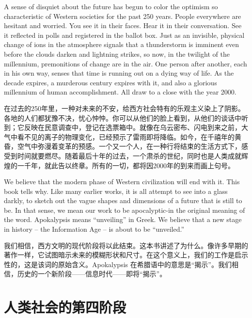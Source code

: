 \begin{Parallel}{97mm}{45mm}
  \ParallelPar
  
  \ParallelLText
  {A sense of disquiet about the future has begun to color the optimism so characteristic of Western societies for the past 250 years. People everywhere are hesitant and worried. You see it in their faces. Hear it in their conversation. See it reflected in polls and registered in the ballot box. Just as an invisible, physical change of ions in the atmosphere signals that a thunderstorm is imminent even before the clouds darken and lightning strikes, so now, in the twilight of the millennium, premonitions of change are in the air. One person after another, each in his own way, senses that time is running out on a dying way of life. As the decade expires, a murderous century expires with it, and also a glorious millennium of human accomplishment. All draw to a close with the year 2000. }
  
  \ParallelRText
  {\small 在过去的250年里，一种对未来的不安，给西方社会特有的乐观主义染上了阴影。各地的人们都犹豫不决，忧心忡忡。你可以从他们的脸上看到，从他们的谈话中听到；它反映在民意调查中，登记在选票箱中。就像在乌云密布、闪电到来之前，大气中看不见的离子的物理变化，已经预示了雷雨即将降临。如今，在千禧年的黄昏，空气中弥漫着变革的预感。一个又一个人，在一种行将结束的生活方式下，感受到时间就要燃尽。随着最后十年的过去，一个肃杀的世纪，同时也是人类成就辉煌的一千年，就此告以终章。所有的一切，都将因2000年的到来而画上句号。 }
  \ParallelPar


  \ParallelLText
  {We believe that the modern phase of Western civilization will end with it. This book tells why. Like many earlier works, it is all attempt to see into a glass darkly, to sketch out the vague shapes and dimensions of a future that is still to be. In that sense, we mean our work to be apocalyptic-in the original meaning of the word. Apokalypsis means “unveiling” in Greek. We believe that a new stage in history -- the Information Age -- is about to be “unveiled.”  }
  
  \ParallelRText
  {\small 我们相信，西方文明的现代阶段将以此结束。这本书讲述了为什么。像许多早期的著作一样，它试图暗示未来的模糊形状和尺寸。在这个意义上，我们的工作是启示性的，这是该词的原始含义。Apokalypsis 在希腊语中的意思是“揭示”。我们相信，历史的一个新阶段——信息时代——即将“揭示”。}
  \ParallelPar

\section{人类社会的第四阶段}


\end{Parallel}
